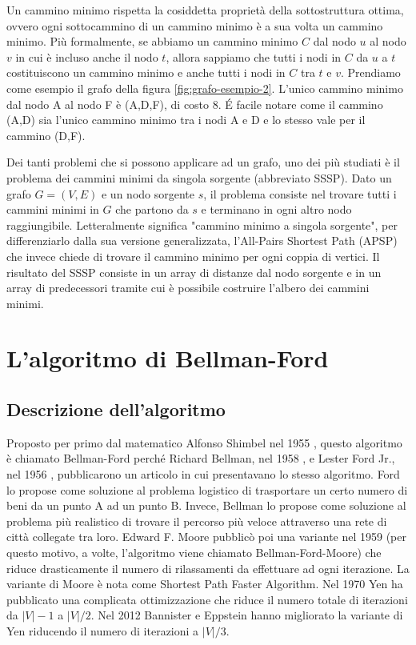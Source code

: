\documentclass[12pt,a4paper,oneside]{book}
\begin{document}
	Un cammino minimo rispetta la cosiddetta proprietà della sottostruttura ottima, ovvero ogni sottocammino di un cammino minimo è a sua volta un cammino minimo. Più formalmente, se abbiamo un cammino minimo $C$ dal nodo $u$ al nodo $v$ in cui è incluso anche il nodo $t$, allora sappiamo che tutti i nodi in $C$ da $u$ a $t$ costituiscono un cammino minimo e anche tutti i nodi in $C$ tra $t$ e $v$. Prendiamo come esempio il grafo della figura \ref{fig:grafo-esempio-2}. L'unico cammino minimo dal nodo A al nodo F è (A,D,F), di costo 8. \'E facile notare come il cammino (A,D) sia l'unico cammino minimo tra i nodi A e D e lo stesso vale per il cammino (D,F).
	
	Dei tanti problemi che si possono applicare ad un grafo, uno dei più studiati è il problema dei cammini minimi da singola sorgente (abbreviato SSSP). Dato un grafo $G=(V,E)$ e un nodo sorgente $s$, il problema consiste nel trovare tutti i cammini minimi in $G$ che partono da $s$ e terminano in ogni altro nodo raggiungibile. Letteralmente significa "cammino minimo a singola sorgente", per differenziarlo dalla sua versione generalizzata, l'All-Pairs Shortest Path (APSP) che invece chiede di trovare il cammino minimo per ogni coppia di vertici. Il risultato del SSSP consiste in un array di distanze dal nodo sorgente e in un array di predecessori tramite cui è possibile costruire l'albero dei cammini minimi.
	
	\chapter{L'algoritmo di Bellman-Ford}
	\label{chap:analisi}
	\section{Descrizione dell'algoritmo}
	Proposto per primo dal matematico Alfonso Shimbel nel 1955 \cite{Shimbel1955}, questo algoritmo è chiamato Bellman-Ford perché Richard Bellman, nel 1958 \cite{Bellman1958}, e Lester Ford Jr., nel 1956 \cite{Ford1956}, pubblicarono un articolo in cui presentavano lo stesso algoritmo. Ford lo propose come soluzione al problema logistico di trasportare un certo numero di beni da un punto A ad un punto B. Invece, Bellman lo propose come soluzione al problema più realistico di trovare il percorso più veloce attraverso una rete di città collegate tra loro. Edward F. Moore pubblicò poi una variante nel 1959 \cite{Moore1959} (per questo motivo, a volte, l'algoritmo viene chiamato Bellman-Ford-Moore) che riduce drasticamente il numero di rilassamenti da effettuare ad ogni iterazione. La variante di Moore è nota come Shortest Path Faster Algorithm. Nel 1970 Yen\cite{Yen1970} ha pubblicato una complicata ottimizzazione che riduce il numero totale di iterazioni da $|V|-1$ a $|V|/2$. Nel 2012 Bannister e Eppstein \cite{Bannister2012} hanno migliorato la variante di Yen riducendo il numero di iterazioni a $|V|/3$.
	
\end{document}

